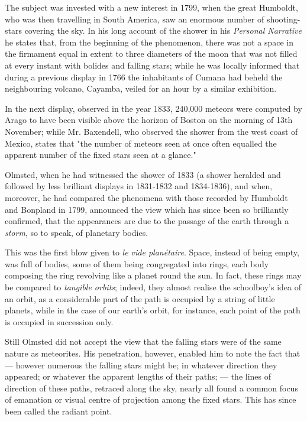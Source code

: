 \documentclass[a4paper, 12pt, oneside, polutonikogreek, english]{article}
\begin{document}
The subject was invested with a new interest in 1799, when the great Humboldt, who was then travelling in South America, saw an enormous number of shooting-stars covering the sky. In his long account of the shower in his \emph{Personal Narrative} he states that, from the beginning of the phenomenon, there was not a space in the firmament equal in extent to three diameters of the moon that was not filled at every instant with bolides and falling stars; while he was locally informed that during a previous display in 1766 the inhabitants of Cumana had beheld the neighbouring volcano, Cayamba, veiled for an hour by a similar exhibition.

In the next display, observed in the year 1833, 240,000 meteors were computed by Arago to have been visible above the horizon of Boston on the morning of 13th November; while Mr. Baxendell, who observed the shower from the west coast of Mexico, states that "the number of meteors seen at once often equalled the apparent number of the fixed stars seen at a glance."

Olmsted, when he had witnessed the shower of 1833 (a shower heralded and followed by less brilliant displays in 1831-1832 and 1834-1836), and when, moreover, he had compared the phenomena with those recorded by Humboldt and Bonpland in 1799, announced the view which has since been so brilliantly confirmed, that the appearances are due to the passage of the earth through a \emph{storm}, so to speak, of planetary bodies.

This was the first blow given to \emph{le vide planétaire}. Space, instead of being empty, was full of bodies, some of them being congregated into rings, each body composing the ring revolving like a planet round the sun. In fact, these rings may be compared to \emph{tangible orbits}; indeed, they almost realise the schoolboy's idea of an orbit, as a considerable part of the path is occupied by a string of little planets, while in the case of our earth's orbit, for instance, each point of the path is occupied in succession only.

Still Olmsted did not accept the view that the falling stars were of the same nature as meteorites. His penetration, however, enabled him to note the fact that --- however numerous the falling stars might be; in whatever direction they appeared; or whatever the apparent lengths of their paths; --- the lines of direction of these paths, retraced along the sky, nearly all found a common focus of emanation or visual centre of projection among the fixed stars. This has since been called the radiant point.
\end{document}
